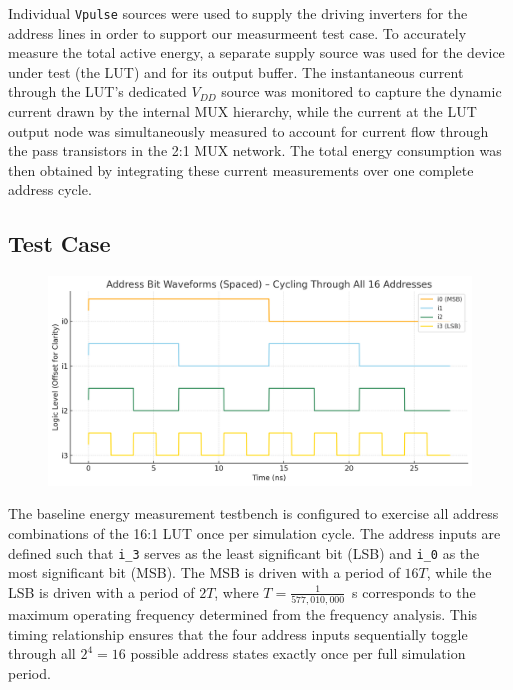\documentclass[12pt]{article}
\begin{document}
Individual \texttt{Vpulse} sources were used to supply the driving inverters for the address lines in order to support our measurmeent test case. To accurately measure the total active energy, a separate supply source was used for the device under test (the LUT) and for its output buffer. The instantaneous current through the LUT’s dedicated $V_{DD}$ source was monitored to capture the dynamic current drawn by the internal MUX hierarchy, while the current at the LUT output node was simultaneously measured to account for current flow through the pass transistors in the 2:1 MUX network. The total energy consumption was then obtained by integrating these current measurements over one complete address cycle.

\newpage

\subsection{Test Case}

\begin{figure}[H]
    \centering
    \includegraphics[width=\linewidth]{writeup//figures/input_case_energy.png}
    \caption{}
\end{figure}

The baseline energy measurement testbench is configured to exercise all address combinations of the 16:1 LUT once per simulation cycle. The address inputs are defined such that \texttt{i\_3} serves as the least significant bit (LSB) and \texttt{i\_0} as the most significant bit (MSB). The MSB is driven with a period of $16T$, while the LSB is driven with a period of $2T$, where $T = \frac{1}{577{,}010{,}000}$~s corresponds to the maximum operating frequency determined from the frequency analysis. This timing relationship ensures that the four address inputs sequentially toggle through all $2^4 = 16$ possible address states exactly once per full simulation period.
\end{document}
